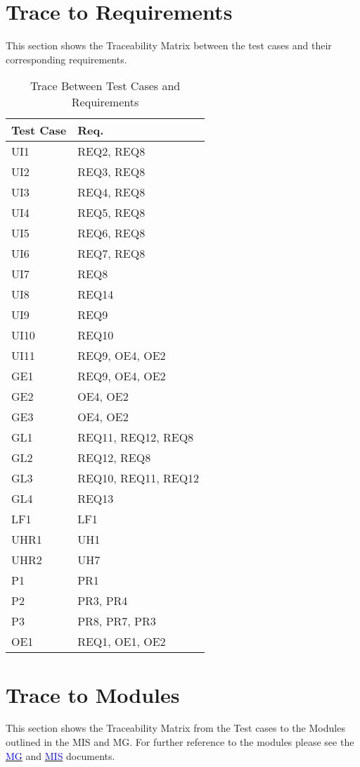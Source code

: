 \documentclass[12pt, titlepage]{article}
\begin{document}
\section{Trace to Requirements}
This section shows the Traceability Matrix between the test cases and their corresponding requirements.

\begin{table}[H]
\centering
\begin{tabular}{p{} p{}}
\toprule
\textbf{Test Case} & \textbf{Req.}\\
\midrule
UI1 & REQ2, REQ8\\
UI2 & REQ3, REQ8\\
UI3 & REQ4, REQ8\\
UI4 & REQ5, REQ8\\
UI5 & REQ6, REQ8\\
UI6 & REQ7, REQ8\\
UI7 & REQ8\\
UI8 & REQ14\\
UI9 & REQ9\\
UI10 & REQ10\\
UI11 & REQ9, OE4, OE2\\
GE1 & REQ9, OE4, OE2\\
GE2 & OE4, OE2\\
GE3 & OE4, OE2 \\
GL1 &  REQ11, REQ12, REQ8\\
GL2 &  REQ12, REQ8\\
GL3 & REQ10, REQ11, REQ12\\
GL4 &  REQ13\\
LF1 &  LF1\\
UHR1 &  UH1\\
UHR2 &  UH7\\
P1 &  PR1\\
P2 & PR3, PR4 \\
P3 & PR8, PR7, PR3\\
OE1 & REQ1, OE1, OE2\\

\bottomrule
\end{tabular}
\caption{Trace Between Test Cases and Requirements}
\label{TblRT}
\end{table}

		
\section{Trace to Modules}		This section shows the Traceability Matrix from the Test cases to the Modules outlined in the MIS and MG. For further reference to the modules please see the \href{https://gitlab.cas.mcmaster.ca/rosnej1/open-mastermind/-/blob/master/Doc/Design/MG/MG.pdf}{\textcolor{blue}{MG}} and \href{https://gitlab.cas.mcmaster.ca/rosnej1/open-mastermind/-/blob/master/Doc/Design/MIS/MIS.pdf}{\textcolor{blue}{MIS}} documents.
\end{document}
